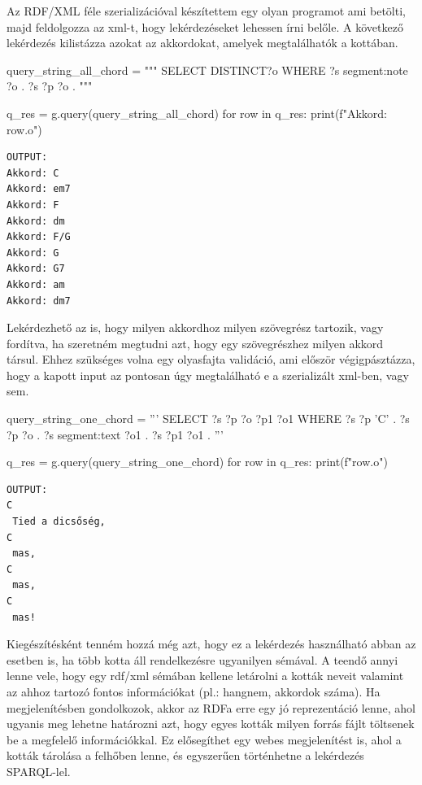 
Az RDF/XML féle szerializációval készítettem egy olyan programot ami betölti, majd feldolgozza az xml-t, hogy lekérdezéseket lehessen írni belőle. A következő lekérdezés kilistázza azokat az akkordokat, amelyek megtalálhatók a kottában.

\begin{python}
query_string_all_chord = """
    SELECT DISTINCT?o
    WHERE {
        ?s segment:note ?o .
        ?s ?p ?o .
    }
"""

q_res = g.query(query_string_all_chord)
for row in q_res:
    print(f"Akkord: {row.o}")
\end{python}
\begin{verbatim}
OUTPUT:
Akkord: C
Akkord: em7
Akkord: F
Akkord: dm
Akkord: F/G
Akkord: G
Akkord: G7
Akkord: am
Akkord: dm7
\end{verbatim}

Lekérdezhető az is, hogy milyen akkordhoz milyen szövegrész tartozik, vagy fordítva, ha szeretném megtudni azt, hogy egy szövegrészhez milyen akkord társul. Ehhez szükséges volna egy olyasfajta validáció, ami először végigpásztázza, hogy a kapott input az pontosan úgy megtalálható e a szerializált xml-ben, vagy sem.

\begin{python}
query_string_one_chord = '''
    SELECT ?s ?p ?o ?p1 ?o1
    WHERE {
        ?s ?p 'C' .
        ?s ?p ?o .
        ?s segment:text ?o1 .
        ?s ?p1 ?o1 .
    }
'''

q_res = g.query(query_string_one_chord)
for row in q_res:
    print(f"{row.o}")
\end{python}
\begin{verbatim}
OUTPUT:
C
 Tied a dicsőség, 
C
 mas, 
C
 mas, 
C
 mas!
\end{verbatim}
Kiegészítésként tenném hozzá még azt, hogy ez a lekérdezés használható abban az esetben is, ha több kotta áll rendelkezésre ugyanilyen sémával. A teendő annyi lenne vele, hogy egy rdf/xml sémában kellene letárolni a kották neveit valamint az ahhoz tartozó fontos információkat (pl.: hangnem, akkordok száma). Ha megjelenítésben gondolkozok, akkor az RDFa erre egy jó reprezentáció lenne, ahol ugyanis meg lehetne határozni azt, hogy egyes kották milyen forrás fájlt töltsenek be a megfelelő információkkal. Ez elősegíthet egy webes megjelenítést is, ahol a kották tárolása a felhőben lenne, és egyszerűen történhetne a lekérdezés SPARQL-lel.


